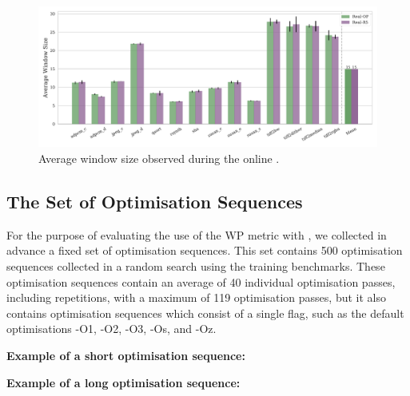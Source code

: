 \begin{figure}[htb]
    \centering
    \includegraphics[width=\textwidth]{figs/window-size.pdf}
    \caption{Average window size observed during the online {\itercomp}.}
    \label{fig:window-size}
\end{figure}


\subsection{The Set of Optimisation Sequences}

For the purpose of evaluating the use of the WP metric with {\itercomp}, we collected in advance a fixed set of optimisation sequences.
This set contains 500 optimisation sequences collected in a random search using the training benchmarks.
These optimisation sequences contain an average of 40 individual optimisation passes, including repetitions, with a maximum of 119 optimisation passes, but it also contains optimisation sequences which consist of a single flag, such as the default optimisations {\flagstype -O1}, {\flagstype -O2}, {\flagstype -O3}, {\flagstype -Os}, and {\flagstype -Oz}.

  \begin{minipage}{0.9\textwidth}
     \vspace{1em}
     \singlespace
     \noindent\textbf{Example of a short optimisation sequence:}\vspace{-1ex}
  \end{minipage}

  \begin{minipage}{0.9\textwidth}
     \vspace{1em}
     \singlespace
     \noindent\textbf{Example of a long optimisation sequence:}\vspace{-1ex}
  \end{minipage}

